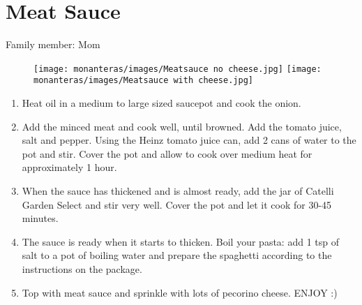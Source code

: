 \chapter{Meat Sauce}
\label{ch:meatsauce}

Family member: Mom


\begin{figure}
    \texttt{[image: monanteras/images/Meatsauce no cheese.jpg]}
    \texttt{[image: monanteras/images/Meatsauce with cheese.jpg]}
\end{figure}


\begin{enumerate}
    \item Heat oil in a medium to large sized saucepot and cook the onion.
    \item Add the minced meat and cook well, until browned. Add the tomato juice, salt and pepper. Using the Heinz tomato juice can, add 2 cans of water to the pot and stir. Cover the pot and allow to cook over medium heat for approximately 1 hour.
    \item When the sauce has thickened and is almost ready, add the jar of Catelli Garden Select and stir very well. Cover the pot and let it cook for 30-45 minutes.
    \item The sauce is ready when it starts to thicken. Boil your pasta: add 1 tsp of salt to a pot of boiling water and prepare the spaghetti according to the instructions on the package.
    \item Top with meat sauce and sprinkle with lots of pecorino cheese. ENJOY :)
\end{enumerate}

